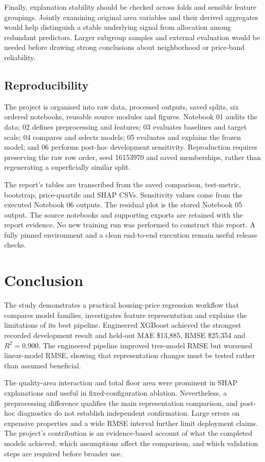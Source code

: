 \documentclass{sigkddExp}
\begin{document}
Finally, explanation stability should be checked across folds and sensible feature groupings. Jointly examining original area variables and their derived aggregates would help distinguish a stable underlying signal from allocation among redundant predictors. Larger subgroup samples and external evaluation would be needed before drawing strong conclusions about neighborhood or price-band reliability.

\subsection{Reproducibility}
The project is organised into raw data, processed outputs, saved splits, six ordered notebooks, reusable source modules and figures. Notebook 01 audits the data; 02 defines preprocessing and features; 03 evaluates baselines and target scale; 04 compares and selects models; 05 evaluates and explains the frozen model; and 06 performs post-hoc development sensitivity. Reproduction requires preserving the raw row order, seed 16153970 and saved memberships, rather than regenerating a superficially similar split.

The report's tables are transcribed from the saved comparison, test-metric, bootstrap, price-quartile and SHAP CSVs. Sensitivity values come from the executed Notebook 06 outputs. The residual plot is the stored Notebook 05 output. The source notebooks and supporting exports are retained with the report evidence. No new training run was performed to construct this report. A fully pinned environment and a clean end-to-end execution remain useful release checks.

\section{Conclusion}
The study demonstrates a practical housing-price regression workflow that compares model families, investigates feature representation and explains the limitations of its best pipeline. Engineered XGBoost achieved the strongest recorded development result and held-out MAE \$13,885, RMSE \$25,354 and $R^2=0.900$. The engineered pipeline improved tree-model RMSE but worsened linear-model RMSE, showing that representation changes must be tested rather than assumed beneficial.

The quality-area interaction and total floor area were prominent in SHAP explanations and useful in fixed-configuration ablation. Nevertheless, a preprocessing difference qualifies the main representation comparison, and post-hoc diagnostics do not establish independent confirmation. Large errors on expensive properties and a wide RMSE interval further limit deployment claims. The project's contribution is an evidence-based account of what the completed models achieved, which assumptions affect the comparison, and which validation steps are required before broader use.
\end{document}
